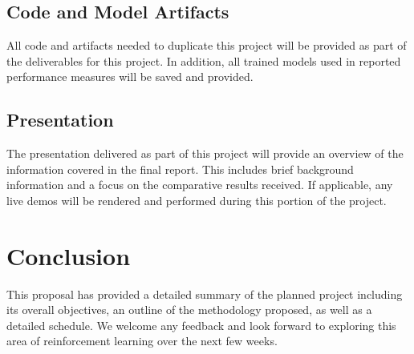 \documentclass[conference]{IEEEtran}
\begin{document}
\subsection{Code and Model Artifacts}
All code and artifacts needed to duplicate this project will be provided as part of the deliverables for this project.
In addition, all trained models used in reported performance measures will be saved and provided.

\subsection{Presentation}
The presentation delivered as part of this project will provide an overview of the information covered in the final report.
This includes brief background information and a focus on the comparative results received.
If applicable, any live demos will be rendered and performed during this portion of the project.

\section{Conclusion}
This proposal has provided a detailed summary of the planned project including its overall objectives, an outline of the methodology proposed, as well as a detailed schedule.
We welcome any feedback and look forward to exploring this area of reinforcement learning over the next few weeks.

{}


\vspace{12pt}
\end{document}
